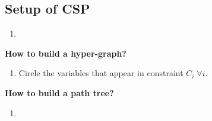 \subsection{Setup of CSP}
\begin{process}
    \begin{enumerate}
        \item 
    \end{enumerate}
\end{process}
\begin{example}
\end{example}
\newpage

\begin{process} \textbf{How to build a hyper-graph?}
    \begin{enumerate}
        \item Circle the variables that appear in constraint $C_i \; \forall i$.
    \end{enumerate}
\end{process}

\begin{example}
\end{example}

\begin{process} \textbf{How to build a path tree?}
    \begin{enumerate}
        \item 
    \end{enumerate}
\end{process}

\begin{example}
\end{example}
\newpage

